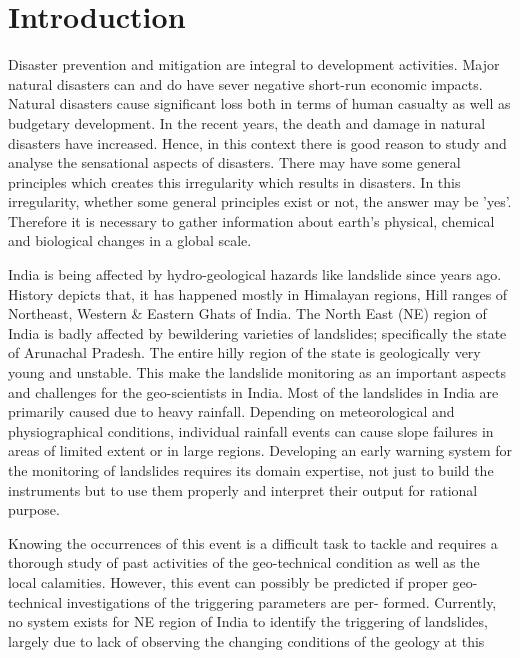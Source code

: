 \documentclass[conference]{IEEEtran}
\begin{document}
\IEEEpeerreviewmaketitle



\section{Introduction}
Disaster prevention and mitigation are integral to development activities. Major natural disasters can and do have
sever negative short-run economic impacts. Natural disasters
cause significant loss both in terms of human casualty as
well as budgetary development. In the recent years, the death
and damage in natural disasters have increased. Hence, in
this context there is good reason to study and analyse the
sensational aspects of disasters. There may have some general
principles which creates this irregularity which results in
disasters. In this irregularity, whether some general principles
exist or not, the answer may be ’yes’. Therefore it is necessary
to gather information about earth’s physical, chemical and
biological changes in a global scale.
\par
India is being affected by hydro-geological hazards like
landslide since years ago. History depicts that, it has happened
mostly in Himalayan regions, Hill ranges of Northeast, Western \& Eastern Ghats of India. The North East (NE) region of
India is badly affected by bewildering varieties of landslides;
specifically the state of Arunachal Pradesh. The entire hilly
region of the state is geologically very young and unstable.
This make the landslide monitoring as an important aspects
and challenges for the geo-scientists in India. Most of the
landslides in India are primarily caused due to heavy rainfall.
Depending on meteorological and physiographical conditions,
individual rainfall events can cause slope failures in areas of
limited extent or in large regions. Developing an early warning
system for the monitoring of landslides requires its domain
expertise, not just to build the instruments but to use them
properly and interpret their output for rational purpose.
\par
Knowing the occurrences of this event is a difficult task
to tackle and requires a thorough study of past activities of
the geo-technical condition as well as the local calamities.
However, this event can possibly be predicted if proper geo-
technical investigations of the triggering parameters are per-
formed. Currently, no system exists for NE region of India
to identify the triggering of landslides, largely due to lack
of observing the changing conditions of the geology at this
\end{document}
